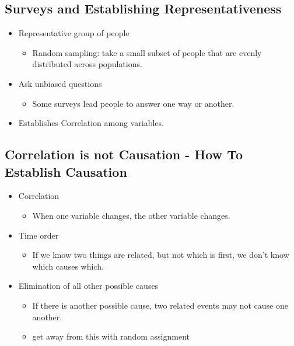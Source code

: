 \documentclass[12pt]{article}
\begin{document}
\subsection*{Surveys and Establishing Representativeness}
\begin{itemize}
    \item Representative group of people
        \begin{itemize}
            \item Random sampling: take a small subset of people that are evenly
                distributed across populations.
        \end{itemize}
    \item Ask unbiased questions
        \begin{itemize}
            \item Some surveys lead people to answer one way or another.
        \end{itemize}
    \item Establishes Correlation among variables.
\end{itemize}

\subsection*{Correlation is not Causation - How To Establish Causation}

\begin{itemize}
    \item Correlation
        \begin{itemize}
            \item When one variable changes, the other variable changes.
        \end{itemize}
    \item Time order
        \begin{itemize}
            \item If we know two things are related, but not which is first, we
                don't know which causes which.
        \end{itemize}
    \item Elimination of all other possible causes
        \begin{itemize}
            \item If there is another possible cause, two related events may not
                cause one another.
            \item get away from this with random assignment
        \end{itemize}
\end{itemize}
\end{document}
